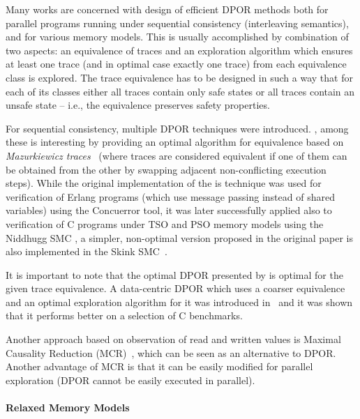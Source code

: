 Many works are concerned with design of efficient DPOR methods both for
parallel programs running under sequential consistency (interleaving
semantics), and for various memory models.
This is usually accomplished by combination of two aspects: an equivalence of
traces and an exploration algorithm which ensures at least one trace (and in
optimal case exactly one trace) from each equivalence class is explored.
The trace equivalence has to be designed in such a way that for each of its
classes either all traces contain only safe states or all traces contain an
unsafe state -- i.e., the equivalence preserves safety properties.

For sequential consistency, multiple DPOR techniques were introduced.
 \cite{TODO,TODO}, among these \cite{Abdulla2014} is interesting by providing an optimal algorithm for equivalence based on \emph{Mazurkiewicz traces}~\cite{Mazurkiewicz1987} (where traces are considered equivalent if one of them can be obtained from the other by swapping adjacent non-conflicting execution steps).
While the original implementation of the is technique was used for verification of Erlang programs (which use message passing instead of shared variables) using the Concuerror tool, it was later successfully applied also to verification of C programs under TSO and PSO memory models using the Niddhugg SMC \cite{Abdulla2017tso}, a simpler, non-optimal version proposed in the original paper is also implemented in the Skink SMC~\cite{Cassez2017}.

It is important to note that the optimal DPOR presented by \cite{Abdulla2014}
is optimal for the given trace equivalence.
A data-centric DPOR which uses a coarser equivalence and an optimal
exploration algorithm for it was introduced in~\cite{Chalupa2017} and it was
shown that it performs better on a selection of C benchmarks.

Another approach based on observation of read and written values is Maximal
Causality Reduction (MCR)~\cite{Huang2015}, which can be seen as an alternative
to DPOR.
Another advantage of MCR is that it can be easily modified for parallel
exploration (DPOR cannot be easily executed in parallel).


\paragraph{Relaxed Memory Models}


